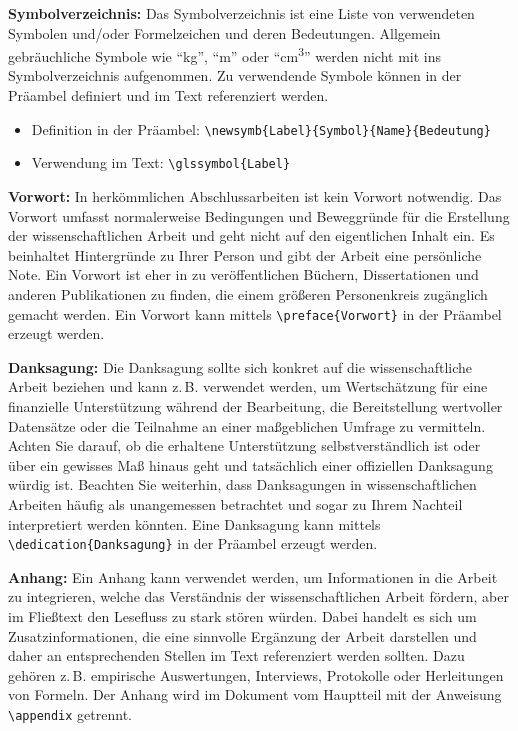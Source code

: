 	\textbf{Symbolverzeichnis:}\label{itm:symbols}
	Das Symbolverzeichnis ist eine Liste von verwendeten Symbolen und/oder Formelzeichen und deren Bedeutungen.
	Allgemein gebräuchliche Symbole wie \enquote{kg}, \enquote{m} oder \enquote{cm\textsuperscript{3}} werden nicht mit ins Symbolverzeichnis aufgenommen.
	Zu verwendende Symbole können in der Präambel definiert und im Text referenziert werden.
	\begin{itemize}
		\item Definition in der Präambel: \verb|\newsymb{Label}{Symbol}{Name}{Bedeutung}|
		\item Verwendung im Text: \verb|\glssymbol{Label}|
	\end{itemize}
	
	\textbf{Vorwort:}\label{itm:preface}
	In herkömmlichen Abschlussarbeiten ist kein Vorwort notwendig.
	Das Vorwort umfasst normalerweise Bedingungen und Beweggründe für die Erstellung der wissenschaftlichen Arbeit und geht nicht auf den eigentlichen Inhalt ein.
	Es beinhaltet Hintergründe zu Ihrer Person und gibt der Arbeit eine persönliche Note.
	Ein Vorwort ist eher in zu veröffentlichen Büchern, Dissertationen und anderen Publikationen zu finden, die einem größeren Personenkreis zugänglich gemacht werden.
	Ein Vorwort kann mittels \verb|\preface{Vorwort}| in der Präambel erzeugt werden.
	
	\textbf{Danksagung:}\label{itm:dedication}
	Die Danksagung sollte sich konkret auf die wissenschaftliche Arbeit beziehen und kann z.\,B. verwendet werden, um Wertschätzung für eine finanzielle Unterstützung während der Bearbeitung, die Bereitstellung wertvoller Datensätze oder die Teilnahme an einer maßgeblichen Umfrage zu vermitteln.
	Achten Sie darauf, ob die erhaltene Unterstützung selbstverständlich ist oder über ein gewisses Maß hinaus geht und tatsächlich einer offiziellen Danksagung würdig ist.
	Beachten Sie weiterhin, dass Danksagungen in wissenschaftlichen Arbeiten häufig als unangemessen betrachtet und sogar zu Ihrem Nachteil interpretiert werden könnten.
	Eine Danksagung kann mittels \verb|\dedication{Danksagung}| in der Präambel erzeugt werden.
	
	\textbf{Anhang:}\label{itm:appendix}
	Ein Anhang kann verwendet werden, um Informationen in die Arbeit zu integrieren, welche das Verständnis der wissenschaftlichen Arbeit fördern, aber im Fließtext den Lesefluss zu stark stören würden.
	Dabei handelt es sich um Zusatzinformationen, die eine sinnvolle Ergänzung der Arbeit darstellen und daher an entsprechenden Stellen im Text referenziert werden sollten.
	Dazu gehören z.\,B. empirische Auswertungen, Interviews, Protokolle oder Herleitungen von Formeln.
	Der Anhang wird im Dokument vom Hauptteil mit der Anweisung \verb|\appendix| getrennt.
	
